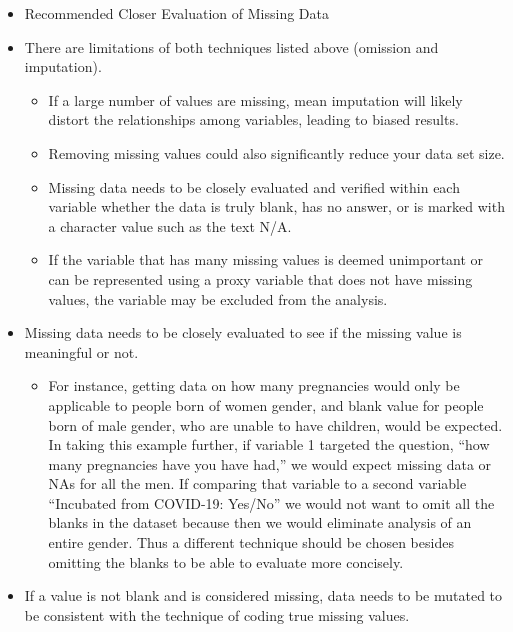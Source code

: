 \documentclass[
  letterpaper,
  DIV=11,
  numbers=noendperiod]{scrreprt}
\providecommand{\tightlist}{%
  \setlength{\itemsep}{0pt}\setlength{\parskip}{0pt}}\usepackage{longtable,booktabs,array}
\begin{document}
\begin{itemize}
\tightlist
\item
  Recommended Closer Evaluation of Missing Data
\item
  There are limitations of both techniques listed above (omission and
  imputation).

  \begin{itemize}
  \tightlist
  \item
    If a large number of values are missing, mean imputation will likely
    distort the relationships among variables, leading to biased
    results.
  \item
    Removing missing values could also significantly reduce your data
    set size.
  \item
    Missing data needs to be closely evaluated and verified within each
    variable whether the data is truly blank, has no answer, or is
    marked with a character value such as the text N/A.
  \item
    If the variable that has many missing values is deemed unimportant
    or can be represented using a proxy variable that does not have
    missing values, the variable may be excluded from the analysis.
  \end{itemize}
\item
  Missing data needs to be closely evaluated to see if the missing value
  is meaningful or not.

  \begin{itemize}
  \tightlist
  \item
    For instance, getting data on how many pregnancies would only be
    applicable to people born of women gender, and blank value for
    people born of male gender, who are unable to have children, would
    be expected. In taking this example further, if variable 1 targeted
    the question, ``how many pregnancies have you have had,'' we would
    expect missing data or NAs for all the men. If comparing that
    variable to a second variable ``Incubated from COVID-19: Yes/No'' we
    would not want to omit all the blanks in the dataset because then we
    would eliminate analysis of an entire gender. Thus a different
    technique should be chosen besides omitting the blanks to be able to
    evaluate more concisely.\\
  \end{itemize}
\item
  If a value is not blank and is considered missing, data needs to be
  mutated to be consistent with the technique of coding true missing
  values.
\end{itemize}
\end{document}
